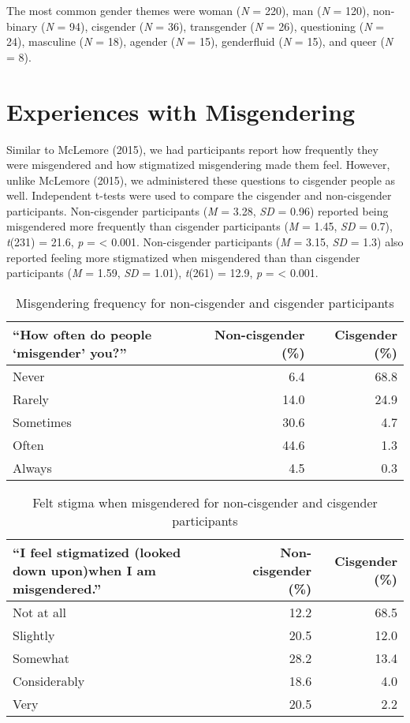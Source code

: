 \documentclass[12pt,twoside]{reedthesis}
\begin{document}
The most common gender themes were woman (\emph{N} = 220), man (\emph{N} = 120), non-binary (\emph{N} = 94), cisgender (\emph{N} = 36), transgender (\emph{N} = 26), questioning (\emph{N} = 24), masculine (\emph{N} = 18), agender (\emph{N} = 15), genderfluid (\emph{N} = 15), and queer (\emph{N} = 8).

\hypertarget{experiences-with-misgendering}{%
\section{Experiences with Misgendering}\label{experiences-with-misgendering}}

Similar to McLemore (2015), we had participants report how frequently they were misgendered and how stigmatized misgendering made them feel. However, unlike McLemore (2015), we administered these questions to cisgender people as well. Independent t-tests were used to compare the cisgender and non-cisgender participants. Non-cisgender participants (\emph{M} = 3.28, \emph{SD} = 0.96) reported being misgendered more frequently than cisgender participants (\emph{M} = 1.45, \emph{SD} = 0.7), \emph{t}(231) = 21.6, \emph{p} = \textless{} 0.001.
Non-cisgender participants (\emph{M} = 3.15, \emph{SD} = 1.3) also reported feeling more stigmatized when misgendered than than cisgender participants (\emph{M} = 1.59, \emph{SD} = 1.01), \emph{t}(261) = 12.9, \emph{p} = \textless{} 0.001.
\begin{table}

\caption{\label{tab:unnamed-chunk-1}Misgendering frequency for non-cisgender and cisgender participants}
\centering
\begin{tabular}[t]{l|r|r}
\hline
“How often do people ‘misgender’ you?” & Non-cisgender (\%) & Cisgender (\%)\\
\hline
Never & 6.4 & 68.8\\
\hline
Rarely & 14.0 & 24.9\\
\hline
Sometimes & 30.6 & 4.7\\
\hline
Often & 44.6 & 1.3\\
\hline
Always & 4.5 & 0.3\\
\hline
\end{tabular}
\end{table}
\begin{table}

\caption{\label{tab:unnamed-chunk-2}Felt stigma when misgendered for non-cisgender and cisgender participants}
\centering
\begin{tabular}[t]{l|r|r}
\hline
“I feel stigmatized (looked down upon)when I am misgendered.” & Non-cisgender (\%) & Cisgender (\%)\\
\hline
Not at all & 12.2 & 68.5\\
\hline
Slightly & 20.5 & 12.0\\
\hline
Somewhat & 28.2 & 13.4\\
\hline
Considerably & 18.6 & 4.0\\
\hline
Very & 20.5 & 2.2\\
\hline
\end{tabular}
\end{table}
\end{document}
